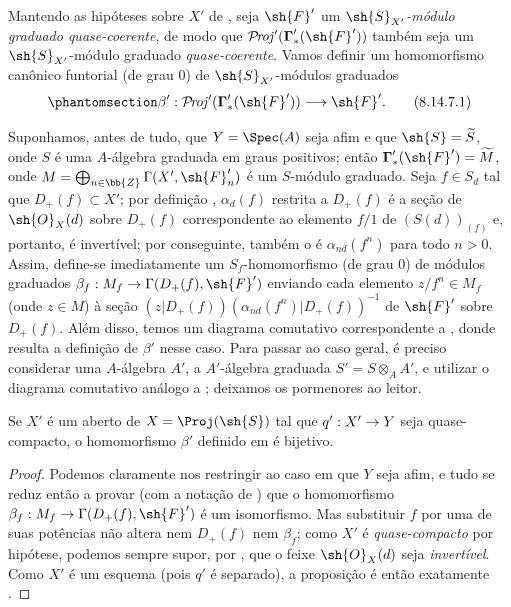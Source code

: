 \documentclass[oneside,10pt]{amsart}
\makeatletter
\newcommand{\ega@arrow}[2]{\mathchoice{#1}{#2}{#2}{#2}}
\renewcommand{\to}{\ega@arrow{\longrightarrow}{\rightarrow}}
\def\shProj{\mathcal{P}\!\mathit{roj}}
\newcommand{\oldpage}[2][]{\marginnote{\normalfont\footnotesize\textbf{#1}~|~#2}\ignorespaces}
\let\EGAOriginalLabel\label
\renewcommand{\label}[1]{\phantomsection\EGAOriginalLabel{#1}}
\makeatother
\begin{document}
\begin{env}[8.14.7]
\label{II.8.14.7}
Mantendo as hipóteses sobre $X'$ de , seja $\sh{F}'$ um \emph{$\sh{S}_{X'}$-módulo graduado quase-coerente}, de modo que $\shProj'(\boldsymbol{\Gamma}'_*(\sh{F}'))$ também seja um $\sh{S}_{X'}$-módulo graduado \emph{quase-coerente}.
\oldpage[II]{200}
Vamos definir um homomorfismo canônico funtorial (de grau $0$) de $\sh{S}_{X'}$-módulos graduados
\[
\label{II.8.14.7.1}
    \beta': \shProj'(\boldsymbol{\Gamma}'_*(\sh{F}')) \to \sh{F}'.
\tag{8.14.7.1}
\]

Suponhamos, antes de tudo, que $Y=\Spec(A)$ seja afim e que $\sh{S}=\widetilde{S}$, onde $S$ é uma $A$-álgebra graduada em graus positivos;
então $\boldsymbol{\Gamma}'_*(\sh{F}')=\widetilde{M}$, onde $M=\bigoplus_{n\in\bb{Z}}\Gamma(X',\sh{F}'_n)$ é um $S$-módulo graduado.
Seja $f\in S_d$ tal que $D_+(f)\subset X'$;
por definição , $\alpha_d(f)$ restrita a $D_+(f)$ é a seção de $\sh{O}_X(d)$ sobre $D_+(f)$ correspondente ao elemento $f/1$ de $(S(d))_{(f)}$ e, portanto, é invertível;
por conseguinte, também o é $\alpha_{nd}(f^n)$ para todo $n>0$.
Assim, define-se imediatamente um $S_f$-homomorfismo (de grau $0$) de módulos graduados $\beta_f:M_f\to\Gamma(D_+(f),\sh{F}')$ enviando cada elemento $z/f^n\in M_f$ (onde $z\in M$) à seção $(z|D_+(f))(\alpha_{nd}(f^n)|D_+(f))^{-1}$ de $\sh{F}'$ sobre $D_+(f)$.
Além disso, temos um diagrama comutativo correspondente a , donde resulta a definição de $\beta'$ nesse caso.
Para passar ao caso geral, é preciso considerar uma $A$-álgebra $A'$, a $A'$-álgebra graduada $S'=S\otimes_A A'$, e utilizar o diagrama comutativo análogo a ;
deixamos os pormenores ao leitor.
\end{env}

\begin{proposition}[8.14.8]
\label{II.8.14.8}
Se $X'$ é um aberto de $X=\Proj(\sh{S})$ tal que $q':X'\to Y$ seja quase-compacto, o homomorfismo $\beta'$ definido em  é bijetivo.
\end{proposition}

\begin{proof}
Podemos claramente nos restringir ao caso em que $Y$ seja afim, e tudo se reduz então a provar (com a notação de ) que o homomorfismo $\beta_f:M_f\to\Gamma(D_+(f),\sh{F}')$ é um isomorfismo.
Mas substituir $f$ por uma de suas potências não altera nem $D_+(f)$ nem $\beta_f$;
como $X'$ é \emph{quase-compacto} por hipótese, podemos sempre supor, por , que o feixe $\sh{O}_X(d)$ seja \emph{invertível}.
Como $X'$ é um esquema (pois $q'$ é separado), a proposição é então exatamente .
\end{proof}
\end{document}
